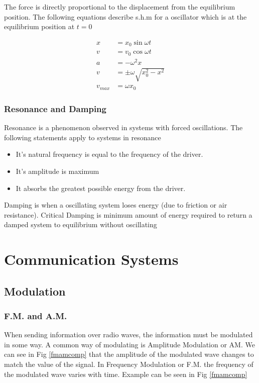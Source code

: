 \documentclass{scrbook}
\begin{document}
	The force is directly proportional to the displacement from the equilibrium position. The following equations describe s.h.m for a oscillator which is at the equilibrium position at $t = 0$

	\begin{align*}
		x &= x_0\sin{\omega t}
		\\
		v &= v_0\cos{\omega t}
		\\
		a &= -\omega^2x
		\\
		v &= \pm \omega \sqrt{x_0^2 - x^2}
		\\
		v_{max} &= \omega x_0
	\end{align*}

\subsection{Resonance and Damping}

	Resonance is a phenomenon observed in systems with forced oscillations. The following statements apply to systems in resonance

	\begin{itemize}
		\item
			It's natural frequency is equal to the frequency of the driver.
		\item
			It's amplitude is maximum
		\item
			It absorbs the greatest possible energy from the driver.
	\end{itemize}

	Damping is when a oscillating system loses energy (due to friction or air resistance). Critical Damping is minimum amount of energy required to return a damped system to equilibrium without oscillating

\chapter{Communication Systems}

\section{Modulation}

\subsection{F.M. and A.M.}

	When sending information over radio waves, the information must be modulated in some way. A common way of modulating is Amplitude Modulation or AM. We can see in Fig \ref{fmamcomp} that the amplitude of the modulated wave changes to match the value of the signal. In Frequency Modulation or F.M. the frequency of the modulated wave varies with time. Example can be seen in Fig \ref{fmamcomp}
\end{document}
